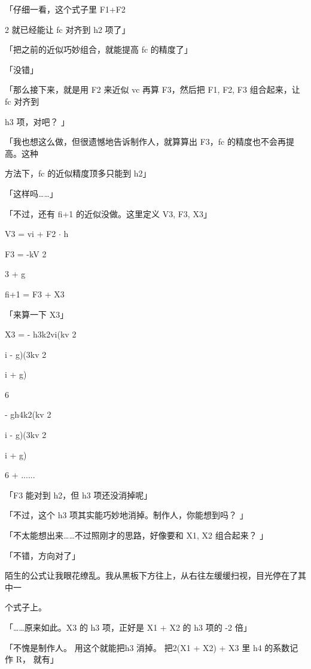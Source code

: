 「仔细一看，这个式子里 F1+F2\par
2 就已经能让 fc 对齐到 h2 项了」\par
「把之前的近似巧妙组合，就能提高 fc 的精度了」\par
「没错」\par
「那么接下来，就是用 F2 来近似 vc 再算 F3，然后把 F1, F2, F3 组合起来，让 fc 对齐到\par
h3 项，对吧？ 」\par
「我也想这么做，但很遗憾地告诉制作人，就算算出 F3，fc 的精度也不会再提高。这种\par
方法下，fc 的近似精度顶多只能到 h2」\par
「这样吗……」\par
「不过，还有 fi+1 的近似没做。这里定义 V3, F3, X3」\par
V3 = vi + F2 $\cdot$ h\par
F3 = -kV 2\par
3 + g\par
fi+1 = F3 + X3\par
「来算一下 X3」\par
X3 = - h3k2vi(kv 2\par
i - g)(3kv 2\par
i + g)\par
6\par
- gh4k2(kv 2\par
i - g)(3kv 2\par
i + g)\par
6 + ......\par
「F3 能对到 h2，但 h3 项还没消掉呢」\par
「不过，这个 h3 项其实能巧妙地消掉。制作人，你能想到吗？ 」\par
「不太能想出来……不过照刚才的思路，好像要和 X1, X2 组合起来？ 」\par
「不错，方向对了」\par
陌生的公式让我眼花缭乱。我从黑板下方往上，从右往左缓缓扫视，目光停在了其中一\par
个式子上。\par
「……原来如此。X3 的 h3 项，正好是 X1 + X2 的 h3 项的 -2 倍」\par
「不愧是制作人。 用这个就能把h3 消掉。 把2(X1 + X2) + X3 里 h4 的系数记作 R， 就有」\par

